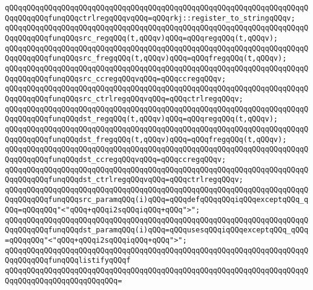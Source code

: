\verb|qQQqqQQqqQQqqQQqqQQqqQQqqQQqqQQqqQQqqQQqqQQqqQQqqQQqqQQqqQQqqQQqqQQqqQQqqQQqqQQqfunqQQqctrlregqQQqvqQQq=qQQqrkj::register_to_stringqQQqv;|\newline
\newline
\verb|qQQqqQQqqQQqqQQqqQQqqQQqqQQqqQQqqQQqqQQqqQQqqQQqqQQqqQQqqQQqqQQqqQQqqQQqqQQqqQQqfunqQQqsrc_regqQQq(t,qQQqv)qQQq=qQQqregqQQq(t,qQQqv);|\newline
\verb|qQQqqQQqqQQqqQQqqQQqqQQqqQQqqQQqqQQqqQQqqQQqqQQqqQQqqQQqqQQqqQQqqQQqqQQqqQQqqQQqfunqQQqsrc_fregqQQq(t,qQQqv)qQQq=qQQqfregqQQq(t,qQQqv);|\newline
\verb|qQQqqQQqqQQqqQQqqQQqqQQqqQQqqQQqqQQqqQQqqQQqqQQqqQQqqQQqqQQqqQQqqQQqqQQqqQQqqQQqfunqQQqsrc_ccregqQQqvqQQq=qQQqccregqQQqv;|\newline
\verb|qQQqqQQqqQQqqQQqqQQqqQQqqQQqqQQqqQQqqQQqqQQqqQQqqQQqqQQqqQQqqQQqqQQqqQQqqQQqqQQqfunqQQqsrc_ctrlregqQQqvqQQq=qQQqctrlregqQQqv;|\newline
\newline
\verb|qQQqqQQqqQQqqQQqqQQqqQQqqQQqqQQqqQQqqQQqqQQqqQQqqQQqqQQqqQQqqQQqqQQqqQQqqQQqqQQqfunqQQqdst_regqQQq(t,qQQqv)qQQq=qQQqregqQQq(t,qQQqv);|\newline
\verb|qQQqqQQqqQQqqQQqqQQqqQQqqQQqqQQqqQQqqQQqqQQqqQQqqQQqqQQqqQQqqQQqqQQqqQQqqQQqqQQqfunqQQqdst_fregqQQq(t,qQQqv)qQQq=qQQqfregqQQq(t,qQQqv);|\newline
\verb|qQQqqQQqqQQqqQQqqQQqqQQqqQQqqQQqqQQqqQQqqQQqqQQqqQQqqQQqqQQqqQQqqQQqqQQqqQQqqQQqfunqQQqdst_ccregqQQqvqQQq=qQQqccregqQQqv;|\newline
\verb|qQQqqQQqqQQqqQQqqQQqqQQqqQQqqQQqqQQqqQQqqQQqqQQqqQQqqQQqqQQqqQQqqQQqqQQqqQQqqQQqfunqQQqdst_ctrlregqQQqvqQQq=qQQqctrlregqQQqv;|\newline
\newline
\verb|qQQqqQQqqQQqqQQqqQQqqQQqqQQqqQQqqQQqqQQqqQQqqQQqqQQqqQQqqQQqqQQqqQQqqQQqqQQqqQQqfunqQQqsrc_paramqQQq(i)qQQq=qQQqdefqQQqqQQqiqQQqexceptqQQq_qQQq=qQQqqQQq"<"qQQq+qQQqi2sqQQqiqQQq+qQQq">";|\newline
\verb|qQQqqQQqqQQqqQQqqQQqqQQqqQQqqQQqqQQqqQQqqQQqqQQqqQQqqQQqqQQqqQQqqQQqqQQqqQQqqQQqfunqQQqdst_paramqQQq(i)qQQq=qQQqusesqQQqiqQQqexceptqQQq_qQQq=qQQqqQQq"<"qQQq+qQQqi2sqQQqiqQQq+qQQq">";|\newline
\newline
\verb|qQQqqQQqqQQqqQQqqQQqqQQqqQQqqQQqqQQqqQQqqQQqqQQqqQQqqQQqqQQqqQQqqQQqqQQqqQQqqQQqfunqQQqlistifyqQQqf|\newline
\verb|qQQqqQQqqQQqqQQqqQQqqQQqqQQqqQQqqQQqqQQqqQQqqQQqqQQqqQQqqQQqqQQqqQQqqQQqqQQqqQQqqQQqqQQqqQQqqQQq=|\newline
